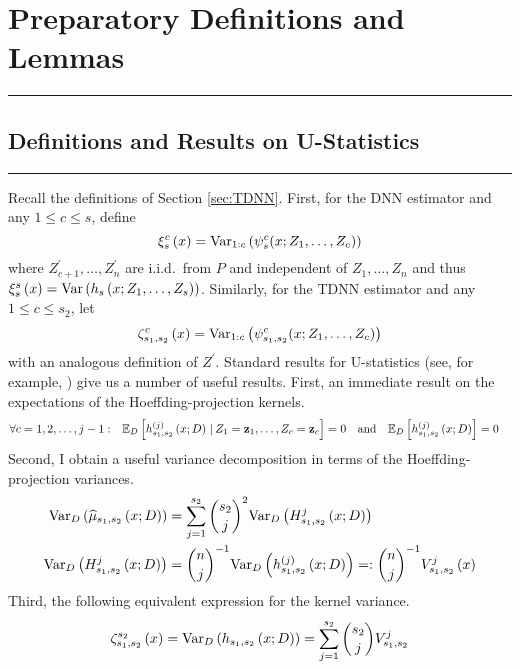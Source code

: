 \section{Preparatory Definitions and Lemmas}
\hrule

\subsection{Definitions and Results on U-Statistics}
\hrule

Recall the definitions of Section \ref{sec:TDNN}.
First, for the DNN estimator and any $1 \leq c \leq s$, define
\begin{equation}\label{eq:xi_s_c}
	\xi_{s}^{c}\left(x\right)
	= \text{Var}_{1:c}\left(\psi_{s}^{c}(x; Z_{1}, \dotsc, Z_{c})\right)
\end{equation}
where $Z_{c+1}^{\prime}, \ldots, Z_n^{\prime}$ are i.i.d.\ from $P$ and independent of $Z_1, \ldots, Z_n$ and thus
$\xi_{s}^{s}\left(x\right) = \text{Var}\left(h_s\left(x; Z_1, \ldots, Z_s\right)\right)$.
Similarly, for the TDNN estimator and any $1 \leq c \leq s_2$, let
\begin{equation}\label{eq:zeta_s1s2_c}
	\zeta_{s_1, s_2}^{c}\left(x\right)
	= \text{Var}_{1:c}\left(\psi_{s_1, s_2}^{c}(x; Z_{1}, \dotsc, Z_{c})\right)
\end{equation}
with an analogous definition of $Z^{\prime}$.
Standard results for U-statistics (see, for example, \citet{lee_u-statistics_2019}) give us a number of useful results.
First, an immediate result on the expectations of the Hoeffding-projection kernels.
\begin{align}\label{eq:H_k_expectation}
	\forall c = 1,2,\dotsc, j-1: \quad & \mathbb{E}_{D}\left[h_{s_1, s_2}^{(j)}\left(x; D\right) \, | \, Z_1 = \mathbf{z}_1, \dotsc, Z_c = \mathbf{z}_c\right] = 0
	\quad \text{and} \quad
	\mathbb{E}_{D}\left[h_{s_1, s_2}^{(j)}\left(x; D\right)\right] = 0
\end{align}
Second, I obtain a useful variance decomposition in terms of the Hoeffding-projection variances.
\begin{align}\label{eq:Var_decomp}
	\text{Var}_{D}\left(\widehat{\mu}_{s_1, s_2}\left(x; D\right)\right)
	 & = \sum_{j = 1}^{s_2} \binom{s_2}{j}^2 \text{Var}_{D}\left(H_{s_1, s_2}^{j}\left(x; D\right)\right) \\
	\text{Var}_{D}\left(H_{s_1, s_2}^{j}\left(x; D\right)\right)
	 & = \binom{n}{j}^{-1} \text{Var}_{D}\left(h_{s_1, s_2}^{(j)}\left(x; D\right)\right)
	=: \binom{n}{j}^{-1} V_{s_1, s_2}^{j}\left(x\right)
\end{align}
Third, the following equivalent expression for the kernel variance.
\begin{equation}\label{eq:k_var}
	\zeta_{s_1, s_2}^{s_2}\left(x\right)
	= \text{Var}_{D}\left(h_{s_1, s_2}\left(x; D\right)\right)
	= \sum_{j = 1}^{s_2} \binom{s_2}{j}V_{s_1, s_2}^{j}
\end{equation}

